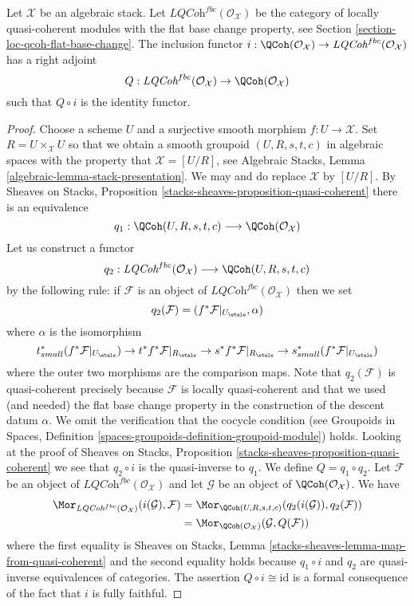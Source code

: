 \begin{lemma}
\label{lemma-adjoint}
Let $\mathcal{X}$ be an algebraic stack. Let
$\textit{LQCoh}^{fbc}(\mathcal{O}_\mathcal{X})$
be the category of locally quasi-coherent modules with the
flat base change property, see
Section \ref{section-loc-qcoh-flat-base-change}.
The inclusion functor
$i : \QCoh(\mathcal{O}_\mathcal{X}) \to
\textit{LQCoh}^{fbc}(\mathcal{O}_\mathcal{X})$
has a right adjoint
$$
Q : \textit{LQCoh}^{fbc}(\mathcal{O}_\mathcal{X}) \to
\QCoh(\mathcal{O}_\mathcal{X})
$$
such that $Q \circ i$ is the identity functor.
\end{lemma}

\begin{proof}
Choose a scheme $U$ and a surjective smooth morphism $f : U \to \mathcal{X}$.
Set $R = U \times_\mathcal{X} U$ so that we obtain a smooth groupoid
$(U, R, s, t, c)$ in algebraic spaces with the property that
$\mathcal{X} = [U/R]$, see
Algebraic Stacks, Lemma \ref{algebraic-lemma-stack-presentation}.
We may and do replace $\mathcal{X}$ by $[U/R]$. By
Sheaves on Stacks, Proposition \ref{stacks-sheaves-proposition-quasi-coherent}
there is an equivalence
$$
q_1 :
\QCoh(U, R, s, t, c)
\longrightarrow
\QCoh(\mathcal{O}_\mathcal{X})
$$
Let us construct a functor
$$
q_2 :
\textit{LQCoh}^{fbc}(\mathcal{O}_\mathcal{X})
\longrightarrow
\QCoh(U, R, s, t, c)
$$
by the following rule: if $\mathcal{F}$ is an object of
$\textit{LQCoh}^{fbc}(\mathcal{O}_\mathcal{X})$ then we set
$$
q_2(\mathcal{F}) = (f^*\mathcal{F}|_{U_\etale}, \alpha)
$$
where $\alpha$ is the isomorphism
$$
t_{small}^*(f^*\mathcal{F}|_{U_\etale})
\to
t^*f^*\mathcal{F}|_{R_\etale} \to
s^*f^*\mathcal{F}|_{R_\etale} \to
s_{small}^*(f^*\mathcal{F}|_{U_\etale})
$$
where the outer two morphisms are the comparison maps. Note that
$q_2(\mathcal{F})$ is quasi-coherent precisely because $\mathcal{F}$ is
locally quasi-coherent and that we used (and needed)
the flat base change property in the construction of
the descent datum $\alpha$. We omit the
verification that the cocycle condition (see
Groupoids in Spaces, Definition
\ref{spaces-groupoids-definition-groupoid-module})
holds. Looking at the proof of
Sheaves on Stacks, Proposition \ref{stacks-sheaves-proposition-quasi-coherent}
we see that $q_2 \circ i$ is the quasi-inverse to $q_1$.
We define $Q = q_1 \circ q_2$.
Let $\mathcal{F}$ be an object of
$\textit{LQCoh}^{fbc}(\mathcal{O}_\mathcal{X})$ and
let $\mathcal{G}$ be an object of $\QCoh(\mathcal{O}_\mathcal{X})$.
We have
\begin{align*}
\Mor_{\textit{LQCoh}^{fbc}(\mathcal{O}_\mathcal{X})}
(i(\mathcal{G}), \mathcal{F})
& =
\Mor_{\QCoh(U, R, s, t, c)}(q_2(i(\mathcal{G})), q_2(\mathcal{F})) \\
& =
\Mor_{\QCoh(\mathcal{O}_\mathcal{X})}(\mathcal{G}, Q(\mathcal{F}))
\end{align*}
where the first equality is
Sheaves on Stacks, Lemma \ref{stacks-sheaves-lemma-map-from-quasi-coherent}
and the second equality holds because $q_1 \circ i$ and $q_2$ are quasi-inverse
equivalences of categories. The assertion $Q \circ i \cong \text{id}$
is a formal consequence of the fact that $i$ is fully faithful.
\end{proof}


